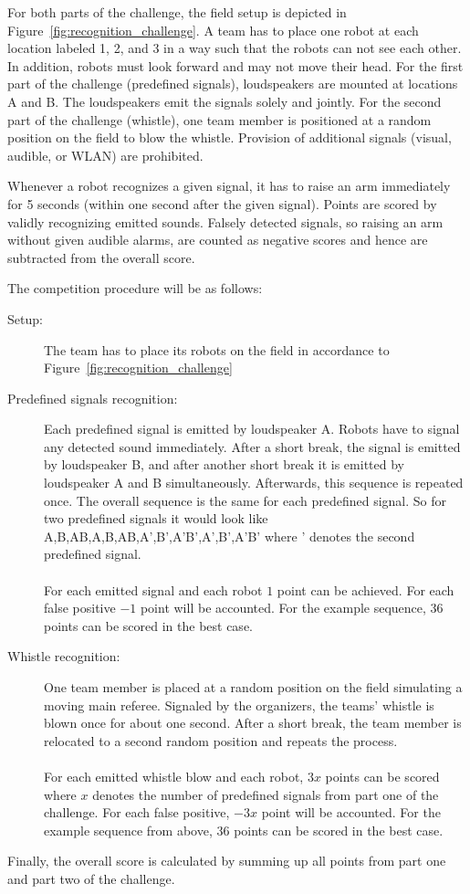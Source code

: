 \documentclass[12pt]{article}
\begin{document}
For both parts of the challenge, the field setup is depicted in Figure~\ref{fig:recognition_challenge}. A team has to place one robot at each location labeled 1, 2, and 3 in a way such that the robots can not see each other. In addition, robots must look forward and may not move their head. For the first part of the challenge (predefined signals), loudspeakers are mounted at locations A and B. The loudspeakers emit the signals solely and jointly. For the second part of the challenge (whistle), one team member is positioned at a random position on the field to blow the whistle. Provision of additional signals (visual, audible, or WLAN) are prohibited.

Whenever a robot recognizes a given signal, it has to raise an arm immediately for 5 seconds (within one second after the given signal).
Points are scored by validly recognizing emitted sounds. Falsely detected signals, so raising an arm without given audible alarms, are counted as negative scores and hence are subtracted from the overall score.

The competition procedure will be as follows:

\begin{description}
	\item[Setup:] The team has to place its robots on the field in accordance to Figure~\ref{fig:recognition_challenge}
	\item[Predefined signals recognition:] Each predefined signal is emitted by loudspeaker A. Robots have to signal any detected sound immediately. After a short break, the signal is emitted by loudspeaker B, and after another short break it is emitted by loudspeaker A and B simultaneously. Afterwards, this sequence is repeated once. The overall sequence is the same for each predefined signal. So for two predefined signals it would look like A,B,AB,A,B,AB,A',B',A'B',A',B',A'B' where ' denotes the second predefined signal.\\
	\\For each emitted signal and each robot $1$ point can be achieved. For each false positive $-1$ point will be accounted. For the example sequence, $36$ points can be scored in the best case.
	\item[Whistle recognition:] One team member is placed at a random position on the field simulating a moving main referee. Signaled by the organizers, the teams' whistle is blown once for about one second. After a short break, the team member is relocated to a second random position and repeats the process.\\
	\\ For each emitted whistle blow and each robot, $3x$ points can be scored where $x$ denotes the number of predefined signals from part one of the challenge. For each false positive, $-3x$ point will be accounted. For the example sequence from above, $36$ points can be scored in the best case.
\end{description}

Finally, the overall score is calculated by summing up all points from part one and part two of the challenge.
\end{document}
